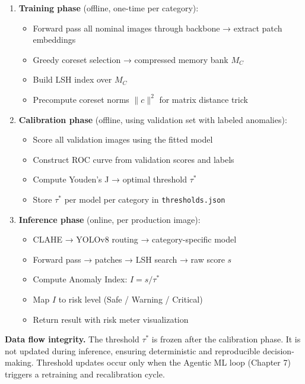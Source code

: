\begin{enumerate}
\def\labelenumi{\arabic{enumi}.}
\tightlist
\item
  \textbf{Training phase} (offline, one-time per category):

  \begin{itemize}
  \tightlist
  \item
    Forward pass all nominal images through backbone → extract patch embeddings
  \item
    Greedy coreset selection → compressed memory bank \(M_C\)
  \item
    Build LSH index over \(M_C\)
  \item
    Precompute coreset norms \(\|c\|^2\) for matrix distance trick
  \end{itemize}
\item
  \textbf{Calibration phase} (offline, using validation set with labeled anomalies):

  \begin{itemize}
  \tightlist
  \item
    Score all validation images using the fitted model
  \item
    Construct ROC curve from validation scores and labels
  \item
    Compute Youden's J → optimal threshold \(\tau^*\)
  \item
    Store \(\tau^*\) per model per category in \texttt{thresholds.json}
  \end{itemize}
\item
  \textbf{Inference phase} (online, per production image):

  \begin{itemize}
  \tightlist
  \item
    CLAHE → YOLOv8 routing → category-specific model
  \item
    Forward pass → patches → LSH search → raw score \(s\)
  \item
    Compute Anomaly Index: \(I = s / \tau^*\)
  \item
    Map \(I\) to risk level (Safe / Warning / Critical)
  \item
    Return result with risk meter visualization
  \end{itemize}
\end{enumerate}

\textbf{Data flow integrity.} The threshold \(\tau^*\) is frozen after the calibration phase. It is not updated during inference, ensuring deterministic and reproducible decision-making. Threshold updates occur only when the Agentic ML loop (Chapter 7) triggers a retraining and recalibration cycle.

